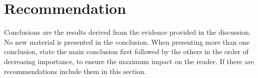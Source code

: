 \section{Recommendation}
Conclusions are the results derived from the evidence provided in the discussion. No new material is presented in the conclusion. When presenting more than one conclusion, state the main conclusion first followed by the others in the order of decreasing importance, to ensure the maximum impact on the reader. If there are recommendations include them in this section.
